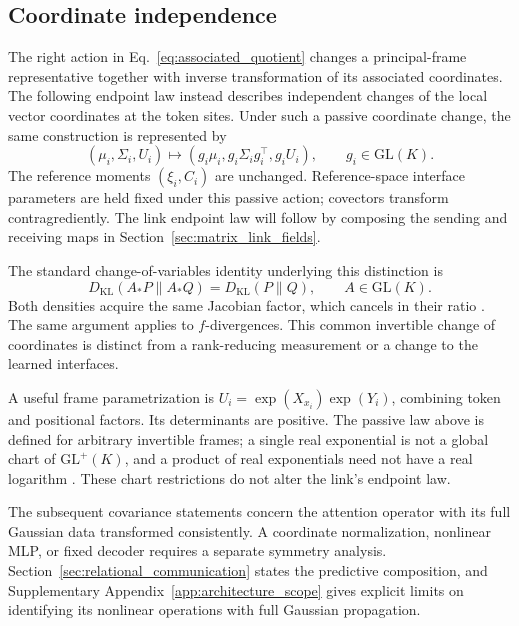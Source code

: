 \documentclass[twoside,11pt]{article}
\begin{document}
\subsection{Coordinate independence}
\label{sec:glk_invariance}

The right action in Eq.~\eqref{eq:associated_quotient} changes a principal-frame representative together with inverse transformation of its associated coordinates. The following endpoint law instead describes independent changes of the local vector coordinates at the token sites. Under such a passive coordinate change, the same construction is represented by
\begin{equation}
(\mu_i,\Sigma_i,U_i)\mapsto
(g_i\mu_i,g_i\Sigma_i g_i^\top,g_iU_i),
\qquad g_i\in\mathrm{GL}(K).
\label{eq:gauge_action_gaussians}
\end{equation}
The reference moments \((\xi_i,C_i)\) are unchanged. Reference-space interface parameters are held fixed under this passive action; covectors transform contragrediently. The link endpoint law will follow by composing the sending and receiving maps in Section~\ref{sec:matrix_link_fields}.

The standard change-of-variables identity underlying this distinction is
\begin{equation}
D_{\mathrm{KL}}(A_*P\|A_*Q)=D_{\mathrm{KL}}(P\|Q),
\qquad A\in\mathrm{GL}(K).
\label{eq:glk_invariance}
\end{equation}
Both densities acquire the same Jacobian factor, which cancels in their ratio \citep{Amari2016}. The same argument applies to \(f\)-divergences. This common invertible change of coordinates is distinct from a rank-reducing measurement or a change to the learned interfaces.

A useful frame parametrization is \(U_i=\exp(X_{x_i})\exp(Y_i)\), combining token and positional factors. Its determinants are positive. The passive law above is defined for arbitrary invertible frames; a single real exponential is not a global chart of \(\mathrm{GL}^+(K)\), and a product of real exponentials need not have a real logarithm \citep{culver1966existence}. These chart restrictions do not alter the link's endpoint law.

The subsequent covariance statements concern the attention operator with its full Gaussian data transformed consistently. A coordinate normalization, nonlinear MLP, or fixed decoder requires a separate symmetry analysis. Section~\ref{sec:relational_communication} states the predictive composition, and Supplementary Appendix~\ref{app:architecture_scope} gives explicit limits on identifying its nonlinear operations with full Gaussian propagation.
\end{document}
